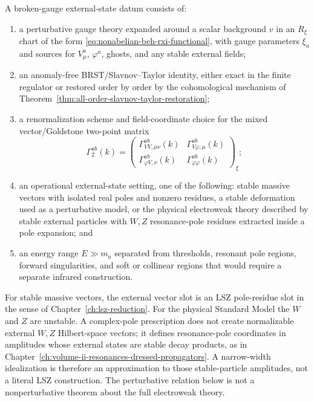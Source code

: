 \begin{definition}
\label{def:broken-gauge-amplitude-datum}
A broken-gauge external-state datum consists of:
\begin{enumerate}
\item a perturbative gauge theory expanded around a scalar background \(v\)
  in an \(R_\xi\) chart of the form
  \eqref{eq:nonabelian-beh-rxi-functional}, with gauge parameters
  \(\xi_a\) and sources for \(V_\mu^a\), \(\varphi^a\), ghosts, and any
  stable external fields;
\item an anomaly-free BRST/Slavnov--Taylor identity, either exact in the
  finite regulator or restored order by order by the cohomological mechanism of
  Theorem~\ref{thm:all-order-slavnov-taylor-restoration};
\item a renormalization scheme and field-coordinate choice for the mixed
  vector/Goldstone two-point matrix
  \[
    \Gamma_2^{ab}(k)=
    \begin{pmatrix}
      \Gamma_{VV,\mu\nu}^{ab}(k) & \Gamma_{V\varphi,\mu}^{ab}(k)\\
      \Gamma_{\varphi V,\nu}^{ab}(k) & \Gamma_{\varphi\varphi}^{ab}(k)
    \end{pmatrix}_{\xi};
  \]
\item an operational external-state setting, one of the following:
  stable massive vectors with isolated real poles and nonzero residues, a
  stable deformation used as a perturbative model, or the physical electroweak
  theory described by stable external particles with \(W,Z\) resonance-pole
  residues extracted inside a pole expansion; and
\item an energy range \(E\gg m_a\) separated from thresholds, resonant pole
  regions, forward singularities, and soft or collinear regions that would
  require a separate infrared construction.
\end{enumerate}
For stable massive vectors, the external vector slot is an LSZ pole-residue
slot in the sense of Chapter~\ref{ch:lsz-reduction}.  For the physical
Standard Model the \(W\) and \(Z\) are unstable.  A complex-pole prescription
does not create normalizable external \(W,Z\) Hilbert-space vectors; it defines
resonance-pole coordinates in amplitudes whose external states are stable
decay products, as in
Chapter~\ref{ch:volume-ii-resonances-dressed-propagators}.  A narrow-width
idealization is therefore an approximation to those stable-particle
amplitudes, not a literal LSZ construction.  The perturbative relation below
is not a nonperturbative theorem about the full electroweak theory.
\end{definition}

